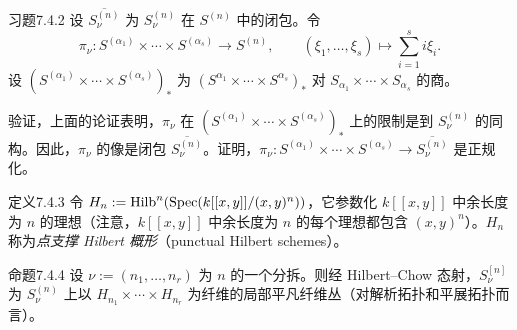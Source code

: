 \begin{origstatement}{习题}{7.4.2}\label{ch07:7.4.2}
设 $\overline{S_\nu^{(n)}}$ 为 $S_\nu^{(n)}$ 在 $S^{(n)}$ 中的闭包。令
\[
\pi_\nu:S^{(\alpha_1)}\times\cdots\times S^{(\alpha_s)}\longrightarrow S^{(n)},\qquad
(\xi_1,\ldots,\xi_s)\longmapsto\sum_{i=1}^s i\xi_i.
\]
设 $(S^{(\alpha_1)}\times\cdots\times S^{(\alpha_s)})_*$ 为 $(S^{\alpha_1}\times\cdots\times S^{\alpha_s})_*$ 对 $S_{\alpha_1}\times\cdots\times S_{\alpha_s}$ 的商。

验证，上面的论证表明，$\pi_\nu$ 在 $(S^{(\alpha_1)}\times\cdots\times S^{(\alpha_s)})_*$ 上的限制是到 $S_\nu^{(n)}$ 的同构。因此，$\pi_\nu$ 的像是闭包 $\overline{S_\nu^{(n)}}$。证明，$\pi_\nu:S^{(\alpha_1)}\times\cdots\times S^{(\alpha_s)}\to\overline{S_\nu^{(n)}}$ 是正规化。
\end{origstatement}
\begin{origstatement}{定义}{7.4.3}\label{ch07:7.4.3}
令 $H_n:=\operatorname{Hilb}^n(\operatorname{Spec}(k[[x,y]]/(x,y)^n))$，它参数化 $k[[x,y]]$ 中余长度为 $n$ 的理想（注意，$k[[x,y]]$ 中余长度为 $n$ 的每个理想都包含 $(x,y)^n$）。$H_n$ 称为\emph{点支撑 Hilbert 概形}（punctual Hilbert schemes）。
\end{origstatement}
\begin{origstatement}{命题}{7.4.4}\label{ch07:7.4.4}
设 $\nu:=(n_1,\ldots,n_r)$ 为 $n$ 的一个分拆。则经 Hilbert--Chow 态射，$S_\nu^{[n]}$ 为 $S_\nu^{(n)}$ 上以 $H_{n_1}\times\cdots\times H_{n_r}$ 为纤维的局部平凡纤维丛（对解析拓扑和平展拓扑而言）。
\end{origstatement}
